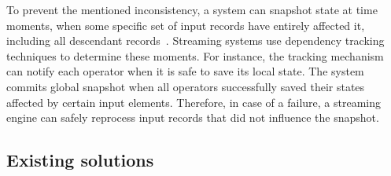 To prevent the mentioned inconsistency, a system can snapshot state at time moments, when some specific set of input records have entirely affected it, including all descendant records~\cite{2015arXiv150608603C, thepaper}. Streaming systems use dependency tracking techniques to determine these moments. For instance, the tracking mechanism can notify each operator when it is safe to save its local state. The system commits global snapshot when all operators successfully saved their states affected by certain input elements. Therefore, in case of a failure, a streaming engine can safely reprocess input records that did not influence the snapshot.

\subsection{Existing solutions}
